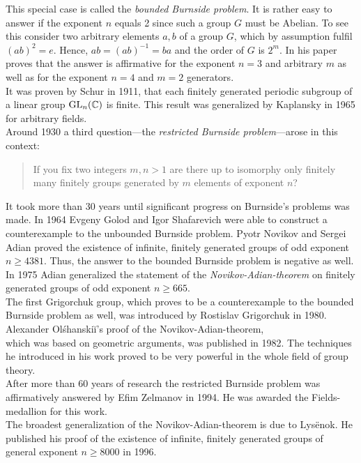 This special case is called the \emph{bounded Burnside problem}. It is rather easy to answer if the exponent $n$ equals 2 since such a group $G$ must be Abelian. To see this consider two arbitrary elements $a,b$ of a group $G$, which by assumption fulfil $(ab)^2=e$. Hence, $ab=(ab)^{-1}=ba$ and the order of $G$ is $2^m$. In his paper \textcite{burnside1902} proves that the answer is affirmative for the exponent $n=3$ and arbitrary $m$ as well as for the exponent $n=4$ and $m=2$ generators.\\
It was proven by Schur in 1911, that each finitely generated periodic subgroup of a linear group $\mathrm{GL}_n(\operatorname{\mathbb{C}})$ is finite. This result was generalized by Kaplansky in 1965 for arbitrary fields.\\
Around 1930 a third question---the \emph{restricted Burnside problem}---arose in this context:
\begin{quotation}
If you fix two integers $m,n>1$ are there up to isomorphy only finitely many finitely groups generated by $m$ elements of exponent $n$?
\end{quotation}
It took more than 30 years until significant progress on Burnside's problems was made. In 1964 Evgeny Golod and Igor Shafarevich were able to construct a counterexample to the unbounded Burnside problem. Pyotr Novikov and Sergei Adian proved the existence of infinite, finitely generated groups of odd exponent $n\geq 4381$. Thus, the answer to the bounded Burnside problem is negative as well. In 1975 Adian generalized the statement of the \emph{Novikov-Adian-theorem} on finitely generated groups of odd exponent $n\geq 665$.\\
The first Grigorchuk group, which proves to be a counterexample to the bounded Burnside problem as well, was introduced by Rostislav Grigorchuk in 1980.\\
Alexander Ol\'{s}hanski\u{i}'s proof of the Novikov-Adian-theorem,\\ which was based on geometric arguments, was published in 1982. The techniques he introduced in his work proved to be very powerful in the whole field of group theory.\\
After more than 60 years of research the restricted Burnside problem was affirmatively answered by Efim Zelmanov in 1994. He was awarded the Fields-medallion for this work.\\
The broadest generalization of the Novikov-Adian-theorem is due to Lys\"{e}nok. He published his proof of the existence of infinite, finitely generated groups of general exponent $n\geq 8000$ in 1996.